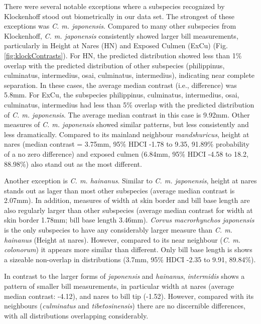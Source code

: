 \documentclass[10pt,a4paper]{article}
\begin{document}
There were several notable exceptions where a subspecies recognized by Klockenhoff stood out biometrically in our data set.
The strongest of these exceptions was \emph{C. m. japonensis}.
Compared to many other subspecies from Klockenhoff, \emph{C. m. japonensis} consistently showed larger bill measurements, particularly in Height at Nares (HN) and Exposed Culmen (ExCu) (Fig. \ref{fig:klockContrasts}).
For HN, the predicted distribution showed less than 1\% overlap with the predicted distribution of other subspecies (philippinus, culminatus, intermedius, osai, culminatus, intermedius), indicating near complete separation.
In these cases, the average median contrast (i.e., difference) was 5.8mm.
For ExCu, the subspecies philippinus, culminatus, intermedius, osai, culminatus, intermedius had less than 5\% overlap with the predicted distribution of \emph{C. m. japonensis}.
The average median contrast in this case is 9.92mm.
Other measures of \emph{C. m. japonensis} showed similar patterns, but less consistently and less dramatically.
Compared to its mainland neighbour \emph{mandshuricus}, height at nares (median contrast = 3.75mm, 95\% HDCI -1.78 to 9.35, 91.89\% probability of a no zero difference) and exposed culmen (6.84mm, 95\% HDCI -4.58 to 18.2, 88.98\%) also stand out as the most different.

Another exception is \emph{C. m. hainanus}.
Similar to \emph{C. m. japonensis}, height at nares stands out as lager than most other subspecies (average median contrast is 2.07mm).
In addition, measures of width at skin border and bill base length are also regularly larger than other subspecies (average median contrast for width at skin border 1.78mm; bill base length 3.46mm).
\emph{Corvus macrorhynchos japonensis} is the only subspecies to have any considerably larger measure than \emph{C. m. hainanus} (Height at nares).
However, compared to its near neighbour (\emph{C. m. colonorum}) it appears more similar than different.
Only bill base length is shows a sizeable non-overlap in distributions (3.7mm, 95\% HDCI -2.35 to 9.91, 89.84\%).

In contrast to the larger forms of \emph{japonensis} and \emph{hainanus}, \emph{intermidis} shows a pattern of smaller bill measurements, in particular width at nares (average median contrast: -4.12), and nares to bill tip (-1.52).
However, compared with its neighbours (\emph{culminatus} and \emph{tibetosinensis}) there are no discernible differences, with all distributions overlapping considerably.
\end{document}
